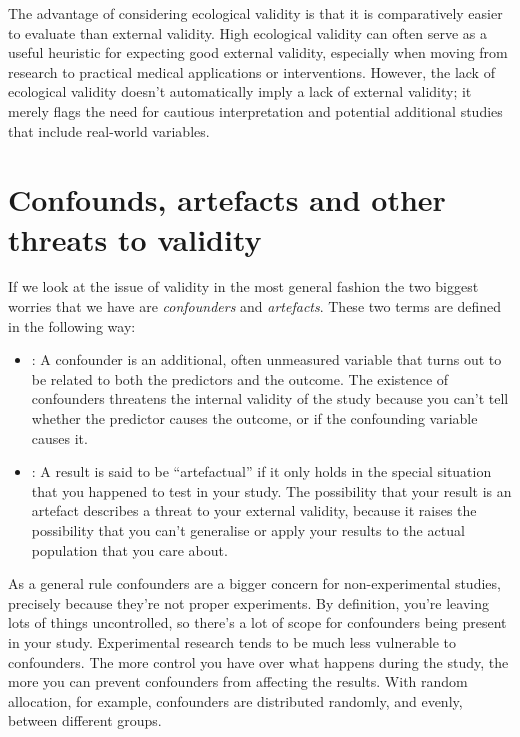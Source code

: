 The advantage of considering ecological validity is that it is comparatively easier to evaluate than external validity. High ecological validity can often serve as a useful heuristic for expecting good external validity, especially when moving from research to practical medical applications or interventions. However, the lack of ecological validity doesn't automatically imply a lack of external validity; it merely flags the need for cautious interpretation and potential additional studies that include real-world variables.

\section{Confounds, artefacts and other threats to validity}

If we look at the issue of validity in the most general fashion the two biggest worries that we have are {\it confounders} and {\it artefacts}. These two terms are defined in the following way:

\begin{itemize}
\item {}: A confounder is an additional, often unmeasured variable that turns out to be related to both the predictors and the outcome. The existence of confounders threatens the internal validity of the study because you can't tell whether the predictor causes the outcome, or if the confounding variable causes it.
\item {}: A result is said to be ``artefactual'' if it only holds in the special situation that you happened to test in your study. The possibility that your result is an artefact describes a threat to your external validity, because it raises the possibility that you can't generalise or apply your results to the actual population that you care about.
\end{itemize}

As a general rule confounders are a bigger concern for non-experimental studies, precisely because they're not proper experiments. By definition, you're leaving lots of things uncontrolled, so there's a lot of scope for confounders being present in your study. Experimental research tends to be much less vulnerable to confounders. The more control you have over what happens during the study, the more you can prevent confounders from affecting the results. With random allocation, for example, confounders are distributed randomly, and evenly, between different groups.


